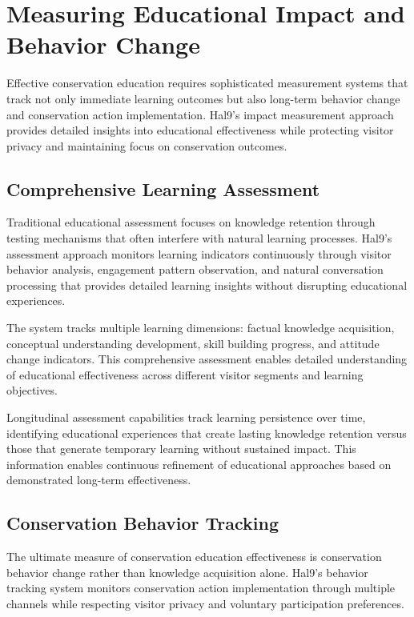 \documentclass[
  Letterpaper,
]{scrbook}
\begin{document}
\section{Measuring Educational Impact and Behavior
Change}\label{measuring-educational-impact-and-behavior-change}

Effective conservation education requires sophisticated measurement
systems that track not only immediate learning outcomes but also
long-term behavior change and conservation action implementation. Hal9's
impact measurement approach provides detailed insights into educational
effectiveness while protecting visitor privacy and maintaining focus on
conservation outcomes.

\subsection{Comprehensive Learning
Assessment}\label{comprehensive-learning-assessment}

Traditional educational assessment focuses on knowledge retention
through testing mechanisms that often interfere with natural learning
processes. Hal9's assessment approach monitors learning indicators
continuously through visitor behavior analysis, engagement pattern
observation, and natural conversation processing that provides detailed
learning insights without disrupting educational experiences.

The system tracks multiple learning dimensions: factual knowledge
acquisition, conceptual understanding development, skill building
progress, and attitude change indicators. This comprehensive assessment
enables detailed understanding of educational effectiveness across
different visitor segments and learning objectives.

Longitudinal assessment capabilities track learning persistence over
time, identifying educational experiences that create lasting knowledge
retention versus those that generate temporary learning without
sustained impact. This information enables continuous refinement of
educational approaches based on demonstrated long-term effectiveness.

\subsection{Conservation Behavior
Tracking}\label{conservation-behavior-tracking}

The ultimate measure of conservation education effectiveness is
conservation behavior change rather than knowledge acquisition alone.
Hal9's behavior tracking system monitors conservation action
implementation through multiple channels while respecting visitor
privacy and voluntary participation preferences.
\end{document}
